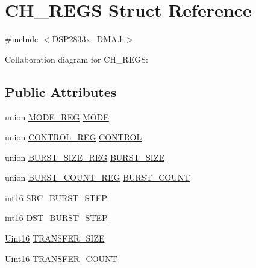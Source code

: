 \hypertarget{struct_c_h___r_e_g_s}{}\section{C\+H\+\_\+\+R\+E\+G\+S Struct Reference}
\label{struct_c_h___r_e_g_s}


{\ttfamily \#include $<$D\+S\+P2833x\+\_\+\+D\+M\+A.\+h$>$}



Collaboration diagram for C\+H\+\_\+\+R\+E\+G\+S\+:
\subsection*{Public Attributes}
\begin{DoxyCompactItemize}
\item 
union \hyperlink{union_m_o_d_e___r_e_g}{M\+O\+D\+E\+\_\+\+R\+E\+G} \hyperlink{struct_c_h___r_e_g_s_a85b80b0daedc0839735b25a0f44bd415}{M\+O\+D\+E}
\item 
union \hyperlink{union_c_o_n_t_r_o_l___r_e_g}{C\+O\+N\+T\+R\+O\+L\+\_\+\+R\+E\+G} \hyperlink{struct_c_h___r_e_g_s_a9d4a092302fe85a24ae87f1b2d172766}{C\+O\+N\+T\+R\+O\+L}
\item 
union \hyperlink{union_b_u_r_s_t___s_i_z_e___r_e_g}{B\+U\+R\+S\+T\+\_\+\+S\+I\+Z\+E\+\_\+\+R\+E\+G} \hyperlink{struct_c_h___r_e_g_s_a3ac1f9e1edf58bc3701f8caad47c4b52}{B\+U\+R\+S\+T\+\_\+\+S\+I\+Z\+E}
\item 
union \hyperlink{union_b_u_r_s_t___c_o_u_n_t___r_e_g}{B\+U\+R\+S\+T\+\_\+\+C\+O\+U\+N\+T\+\_\+\+R\+E\+G} \hyperlink{struct_c_h___r_e_g_s_ad12e5e7af49db054eaae0252506d589b}{B\+U\+R\+S\+T\+\_\+\+C\+O\+U\+N\+T}
\item 
\hyperlink{_d_s_p2833x___device_8h_a74c874318b0a5111bb5c5119fa8c71b5}{int16} \hyperlink{struct_c_h___r_e_g_s_a8e981e895ab2734245a69a0d2c86091e}{S\+R\+C\+\_\+\+B\+U\+R\+S\+T\+\_\+\+S\+T\+E\+P}
\item 
\hyperlink{_d_s_p2833x___device_8h_a74c874318b0a5111bb5c5119fa8c71b5}{int16} \hyperlink{struct_c_h___r_e_g_s_a8378aeaf19a7053227c74dadf80a3309}{D\+S\+T\+\_\+\+B\+U\+R\+S\+T\+\_\+\+S\+T\+E\+P}
\item 
\hyperlink{_d_s_p2833x___device_8h_a59a9f6be4562c327cbfb4f7e8e18f08b}{Uint16} \hyperlink{struct_c_h___r_e_g_s_af98f798dbc69de38d844be4c7ce824d9}{T\+R\+A\+N\+S\+F\+E\+R\+\_\+\+S\+I\+Z\+E}
\item 
\hyperlink{_d_s_p2833x___device_8h_a59a9f6be4562c327cbfb4f7e8e18f08b}{Uint16} \hyperlink{struct_c_h___r_e_g_s_ae29bd6656de24b37227deab48f2e246d}{T\+R\+A\+N\+S\+F\+E\+R\+\_\+\+C\+O\+U\+N\+T}

\end{DoxyCompactItemize}
